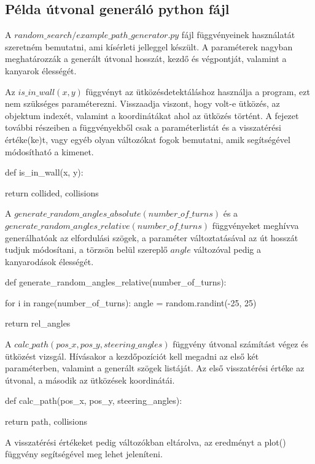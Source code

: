 

\subsection{Példa útvonal generáló python fájl}

A $random\_search/example\_path\_generator.py$ fájl függvényeinek használatát szeretném bemutatni, ami kísérleti jelleggel készült. A paraméterek nagyban meghatározzák a generált útvonal hosszát, kezdő és végpontját, valamint a kanyarok élességét. 

Az $is\_in\_wall(x, y)$ függvényt az ütközésdetektáláshoz használja a program, ezt nem szükséges paraméterezni. Visszaadja viszont, hogy volt-e ütközés, az objektum indexét, valamint a koordinátákat ahol az ütközés történt.
A fejezet további részeiben a függvényekből csak a paraméterlistát és a visszatérési értéke(ke)t, vagy egyéb olyan változókat fogok bemutatni, amik segítségével módosítható a kimenet.
\begin{python}
def is_in_wall(x, y):

    return collided, collisions
\end{python}
A $ generate\_random\_angles\_absolute(number\_of\_turns) $ és a\\ $ generate\_random\_angles\_relative(number\_of\_turns) $ függvényeket meghívva generálhatóak az elfordulási szögek, a paraméter változtatásával az út hosszát tudjuk módosítani, a törzsön belül szereplő $ angle $ változóval pedig a kanyarodások élességét.
\begin{python}
def generate_random_angles_relative(number_of_turns):
	
    for i in range(number_of_turns):
        angle = random.randint(-25, 25)
	    
    return rel_angles
\end{python}
A $ calc\_path(pos\_x, pos\_y, steering\_angles) $ függvény útvonal számítást végez és ütközést vizsgál. Hívásakor a kezdőpozíciót kell megadni az első két paraméterben, valamint a generált szögek listáját. Az első visszatérési értéke az útvonal, a második az ütközések koordinátái.
\begin{python}
def calc_path(pos_x, pos_y, steering_angles):

    return path, collisions
\end{python}
A visszatérési értékeket pedig változókban eltárolva, az eredményt a plot() függvény segítségével meg lehet jeleníteni. 

